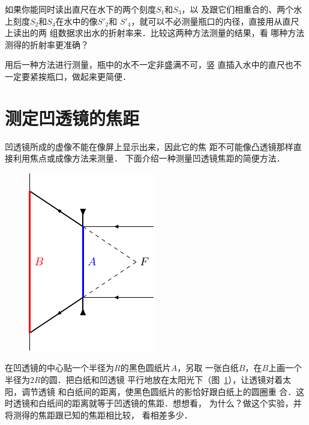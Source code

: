  
如果你能同时读出直尺在水下的两个刻度$S_1$和$S_3$，以
及跟它们相重合的、两个水上刻度$S_2$和$S_4$在水中的像$S'_2$和
$S'_4$，就可以不必测量瓶口的内径，直接用从直尺上读出的两
组数据求出水的折射率来．比较这两种方法测量的结果，看
哪种方法测得的折射率更准确？

用后一种方法进行测量，瓶中的水不一定非盛满不可，竖
直插入水中的直尺也不一定要紧挨瓶口，做起来更简便．

\section{测定凹透镜的焦距}
凹透镜所成的虚像不能在像屏上显示出来，因此它的焦
距不可能像凸透镜那样直接利用焦点或成像方法来测量．
下面介绍一种测量凹透镜焦距的简便方法．

\begin{figure}[htbp]
	\centering
	\includegraphics{fig/C/10-15.pdf}
	\caption{}\label{fig_C_10-15}
\end{figure}


在凹透镜的中心贴一个半径为$R$的黑色圆纸片$A$，另取
一张白纸$B$，在$B$上画一个半径为$2R$的圆．把白纸和凹透镜
平行地放在太阳光下（图~\ref{fig_C_10-15}），让透镜对着太阳，调节透镜
和白纸间的距离，使黑色圆纸片的影恰好跟白纸上的圆圈重
合．这时透镜和白纸间的距离就等于凹透镜的焦距．想想看，
为什么？做这个实验，并将测得的焦距跟已知的焦距相比较，
看相差多少．




